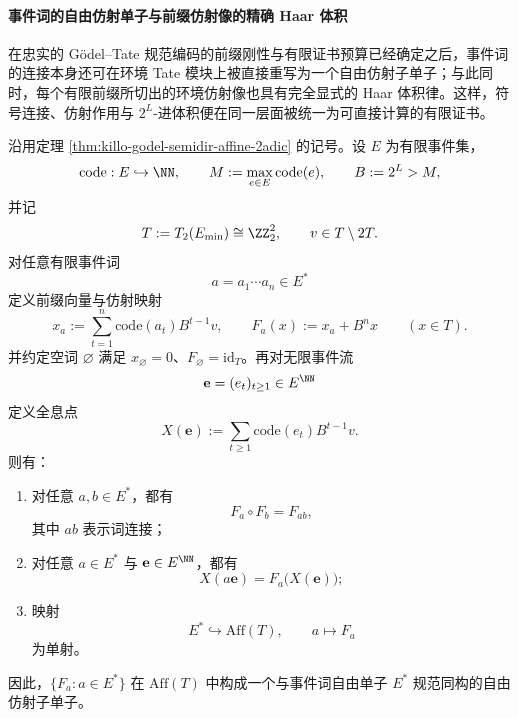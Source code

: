 \paragraph{事件词的自由仿射单子与前缀仿射像的精确 Haar 体积}
在忠实的 Gödel--Tate 规范编码的前缀刚性与有限证书预算已经确定之后，事件词的连接本身还可在环境 Tate 模块上被直接重写为一个自由仿射子单子；与此同时，每个有限前缀所切出的环境仿射像也具有完全显式的 Haar 体积律。这样，符号连接、仿射作用与 \(2^L\)-进体积便在同一层面被统一为可直接计算的有限证书。

\begin{theorem}\label{thm:xi-time-part62cc-eventword-free-affine-submonoid}
沿用定理 \ref{thm:killo-godel-semidir-affine-2adic} 的记号。设 \(E\) 为有限事件集，
\[
\mathrm{code}:E\hookrightarrow \NN,
\qquad
M:=\max_{e\in E}\mathrm{code}(e),
\qquad
B:=2^L>M,
\]
并记
\[
T:=T_2(E_{\min})\cong \ZZ_2^2,
\qquad
v\in T\setminus 2T.
\]
对任意有限事件词
\[
a=a_1\cdots a_n\in E^\ast
\]
定义前缀向量与仿射映射
\[
x_a:=\sum_{t=1}^{n}\mathrm{code}(a_t)B^{t-1}v,
\qquad
F_a(x):=x_a+B^n x
\qquad(x\in T).
\]
并约定空词 \(\varnothing\) 满足 \(x_{\varnothing}=0\)、\(F_{\varnothing}=\mathrm{id}_T\)。再对无限事件流
\[
\mathbf e=(e_t)_{t\ge 1}\in E^{\NN}
\]
定义全息点
\[
X(\mathbf e):=\sum_{t\ge 1}\mathrm{code}(e_t)B^{t-1}v.
\]
则有：
\begin{enumerate}
  \item 对任意 \(a,b\in E^\ast\)，都有
  \[
  F_a\circ F_b=F_{ab},
  \]
  其中 \(ab\) 表示词连接；
  \item 对任意 \(a\in E^\ast\) 与 \(\mathbf e\in E^{\NN}\)，都有
  \[
  X(a\mathbf e)=F_a\bigl(X(\mathbf e)\bigr);
  \]
  \item 映射
  \[
  E^\ast\hookrightarrow \mathrm{Aff}(T),
  \qquad
  a\longmapsto F_a
  \]
  为单射。
\end{enumerate}
因此，\(\{F_a:a\in E^\ast\}\) 在 \(\mathrm{Aff}(T)\) 中构成一个与事件词自由单子 \(E^\ast\) 规范同构的自由仿射子单子。
\end{theorem}
